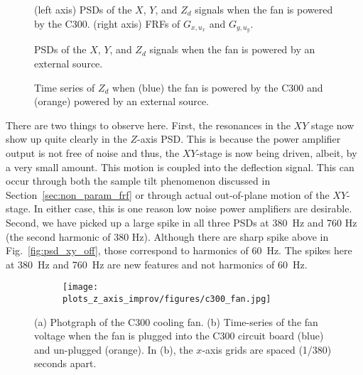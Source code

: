 \begin{figure}[ht!]
  \begin{minipage}[t]{1\textwidth}
    
    \caption{(left axis) PSDs of the $X$, $Y$, and $Z_d$ signals when the fan is powered by the C300. (right axis) FRFs of $G_{x,u_x}$ and $G_{y,u_y}$.}
    \label{fig:psd_xy_on_int}
  \end{minipage}
  \begin{minipage}[t]{1\textwidth}
    
    \caption{PSDs of the $X$, $Y$, and $Z_d$ signals when the fan is powered by an external source.}
    \label{fig:psd_xy_on_ext}
  \end{minipage}
  \begin{minipage}[t]{1\textwidth}
    
    \caption{Time series of $Z_d$ when (blue) the fan is powered by the C300 and (orange) powered by an external source.}
    \label{fig:psd_xy_on_time}
  \end{minipage}
\end{figure}

There are two things to observe here. First, the resonances in the $XY$ stage now show up quite clearly in the $Z$-axis PSD. This is because the power amplifier output is not free of noise and thus, the $XY$-stage is now being driven, albeit, by a very small amount. This motion is coupled into the deflection signal. This can occur through both the sample tilt phenomenon discussed in Section~\ref{sec:non_param_frf} or through actual out-of-plane motion of the $XY$-stage. In either case, this is one reason low noise power amplifiers are desirable. 
Second, we have picked up a large spike in all three PSDs at 380~Hz and 760 Hz (the second harmonic of 380 Hz). Although there are sharp spike above in Fig.~\ref{fig:psd_xy_off}, those correspond to harmonics of 60~Hz. The spikes here at 380~Hz and 760~Hz are new features and not harmonics of 60~Hz.

\begin{figure}
  \begin{subfigure}{.48\textwidth}
    \centering
    \texttt{[image: plots\_z\_axis\_improv/figures/c300\_fan.jpg]}
    \caption{ }
    \label{fig:c300_fan_pic}
  \end{subfigure}
  \begin{subfigure}{.48\textwidth}
    \centering
    
    \caption{ }
    \label{fig:c300_fan_voltage}
  \end{subfigure}
  \caption{(a) Photgraph of the C300 cooling fan. (b) Time-series of the fan voltage when the fan is plugged into the C300 circuit board (blue) and un-plugged (orange). In (b), the $x$-axis grids are spaced (1/380) seconds apart.}
  \label{fig: }
\end{figure}

